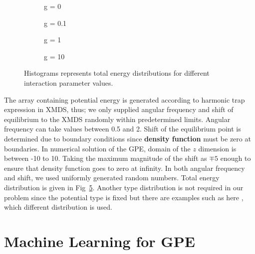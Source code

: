 \documentclass[a4paper,times,12pt]{article}
\begin{document}
\begin{figure}[H]
    \centering
    \begin{subfigure}[t]{0.45\textwidth}
        
        \caption{g = 0}
		\label{fig:a}
    \end{subfigure}
    \begin{subfigure}[t]{0.45\textwidth}
        
        \caption{g = 0.1}
		\label{fig:b}
    \end{subfigure}
    \begin{subfigure}[t]{0.45\textwidth}
        
        \caption{g = 1}
		\label{fig:c}
    \end{subfigure}
    \begin{subfigure}[t]{0.45\textwidth}
        
        \caption{g = 10}
		\label{fig:d}
    \end{subfigure}
    \caption{Histograms represents total energy distributions for different interaction parameter values.}
\label{fig:energy_dist}
\end{figure}


The array containing potential energy is generated according to harmonic trap expression in XMDS, thus; we only supplied angular frequency and shift of equilibrium to the XMDS randomly within predetermined limits. Angular frequency can take values between 0.5 and 2. Shift of the equilibrium point is determined due to boundary conditions since \textbf{density function} must be zero at boundaries. In numerical solution of the GPE, domain of the $z$ dimension is between -10 to 10. Taking the maximum magnitude of the shift as $\mp 5$ enough to ensure that density function goes to zero at infinity. In both angular frequency and shift, we used uniformly generated random numbers. Total energy distribution is given in Fig~\ref{fig:energy_dist}. Another type distribution is not required in our problem since the potential type is fixed but there are examples such as here \cite{mills2017deep}, which different distribution is used.

\section{Machine Learning for GPE}
\end{document}
